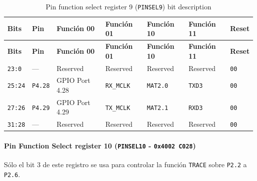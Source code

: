\begin{longtable}{|>{\raggedright\arraybackslash}p{}|>{\raggedright\arraybackslash}p{}|>{\raggedright\arraybackslash}p{}|>{\raggedright\arraybackslash}p{}|>{\raggedright\arraybackslash}p{}|>{\raggedright\arraybackslash}p{}|>{\centering\arraybackslash}p{}|}
\caption{Pin function select register 9 (\texttt{PINSEL9}) bit description}\\
\hline
\textbf{Bits} & \textbf{Pin} & \textbf{Función 00} & \textbf{Función 01} & \textbf{Función 10} & \textbf{Función 11} & \textbf{Reset} \\
\hline
\endfirsthead
\hline
\textbf{Bits} & \textbf{Pin} & \textbf{Función 00} & \textbf{Función 01} & \textbf{Función 10} & \textbf{Función 11} & \textbf{Reset} \\
\hline
\endhead
\texttt{23:0} & --- & Reserved & Reserved & Reserved & Reserved & \texttt{00} \\
\hline
\texttt{25:24} & \texttt{P4.28} & GPIO Port 4.28 & \texttt{RX\_MCLK} & \texttt{MAT2.0} & \texttt{TXD3} & \texttt{00} \\
\hline
\texttt{27:26} & \texttt{P4.29} & GPIO Port 4.29 & \texttt{TX\_MCLK} & \texttt{MAT2.1} & \texttt{RXD3} & \texttt{00} \\
\hline
\texttt{31:28} & --- & Reserved & Reserved & Reserved & Reserved & \texttt{00} \\
\hline
\end{longtable}

\paragraph{Pin Function Select register 10 (\texttt{PINSEL10} - \texttt{0x4002 C028})}
Sólo el bit 3 de este registro se usa para controlar la función \texttt{TRACE} sobre \texttt{P2.2} a \texttt{P2.6}.

